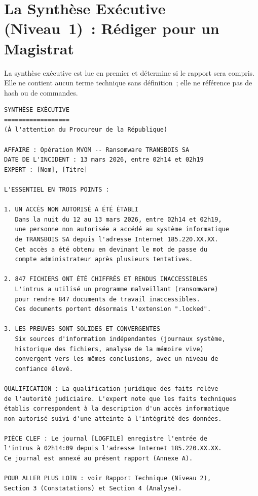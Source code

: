\section{La Synthèse Exécutive (Niveau~1)~: Rédiger pour un Magistrat}
\label{sec:synthese-executive}

La synthèse exécutive est lue en premier et détermine si le rapport
sera compris. Elle ne contient aucun terme technique sans définition~;
elle ne référence pas de hash ou de commandes.

\begin{lstlisting}[language=bash_forensique,
    caption={Modèle de synthèse exécutive -- cas MVOM}]
SYNTHÈSE EXÉCUTIVE
==================
(À l'attention du Procureur de la République)

AFFAIRE : Opération MVOM -- Ransomware TRANSBOIS SA
DATE DE L'INCIDENT : 13 mars 2026, entre 02h14 et 02h19
EXPERT : [Nom], [Titre]

L'ESSENTIEL EN TROIS POINTS :

1. UN ACCÈS NON AUTORISÉ A ÉTÉ ÉTABLI
   Dans la nuit du 12 au 13 mars 2026, entre 02h14 et 02h19,
   une personne non autorisée a accédé au système informatique
   de TRANSBOIS SA depuis l'adresse Internet 185.220.XX.XX.
   Cet accès a été obtenu en devinant le mot de passe du
   compte administrateur après plusieurs tentatives.

2. 847 FICHIERS ONT ÉTÉ CHIFFRÉS ET RENDUS INACCESSIBLES
   L'intrus a utilisé un programme malveillant (ransomware)
   pour rendre 847 documents de travail inaccessibles.
   Ces documents portent désormais l'extension ".locked".

3. LES PREUVES SONT SOLIDES ET CONVERGENTES
   Six sources d'information indépendantes (journaux système,
   historique des fichiers, analyse de la mémoire vive)
   convergent vers les mêmes conclusions, avec un niveau de
   confiance élevé.

QUALIFICATION : La qualification juridique des faits relève
de l'autorité judiciaire. L'expert note que les faits techniques
établis correspondent à la description d'un accès informatique
non autorisé suivi d'une atteinte à l'intégrité des données.

PIÈCE CLEF : Le journal [LOGFILE] enregistre l'entrée de
l'intrus à 02h14:09 depuis l'adresse Internet 185.220.XX.XX.
Ce journal est annexé au présent rapport (Annexe A).

POUR ALLER PLUS LOIN : voir Rapport Technique (Niveau 2),
Section 3 (Constatations) et Section 4 (Analyse).
\end{lstlisting}

